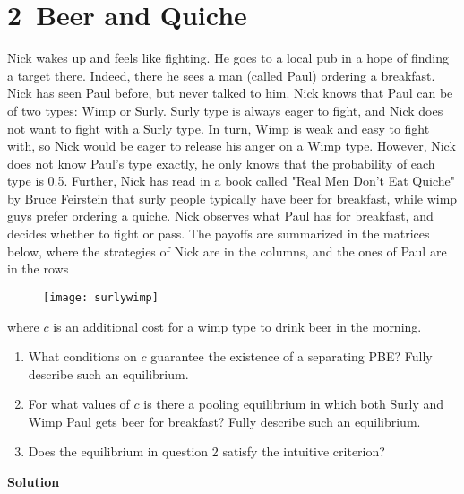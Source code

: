 \documentclass[a4paper]{article}
\begin{document}
\section*{2\ Beer and Quiche}
Nick wakes up and feels like fighting. He goes to a local pub in a hope of finding a target
there. Indeed, there he sees a man (called Paul) ordering a breakfast. Nick has seen Paul
before, but never talked to him. Nick knows that Paul can be of two types: Wimp or
Surly. Surly type is always eager to fight, and Nick does not want to fight with a Surly
type. In turn, Wimp is weak and easy to fight with, so Nick would be eager to release
his anger on a Wimp type. However, Nick does not know Paul's type exactly, he only
knows that the probability of each type is 0.5. Further, Nick has read in a book called
"Real Men Don't Eat Quiche" by Bruce Feirstein that surly people typically have beer
for breakfast, while wimp guys prefer ordering a quiche. Nick observes what Paul has
for breakfast, and decides whether to fight or pass. The payoffs are summarized in the
matrices below, where the strategies of Nick are in the columns, and the ones of Paul are
in the rows

\begin{figure}[H]
	\centering
	\texttt{[image: surlywimp]}
	\label{fig4}
\end{figure}
where $c$ is an additional cost for a wimp type to drink beer in the morning.
\begin{enumerate}
\item What conditions on $c$ guarantee the existence of a separating PBE? Fully describe
such an equilibrium.
\item For what values of $c$ is there a pooling equilibrium in which both Surly and Wimp
Paul gets beer for breakfast? Fully describe such an equilibrium.
\item Does the equilibrium in question 2 satisfy the intuitive criterion?
\end{enumerate}

\textbf{Solution}
\end{document}

